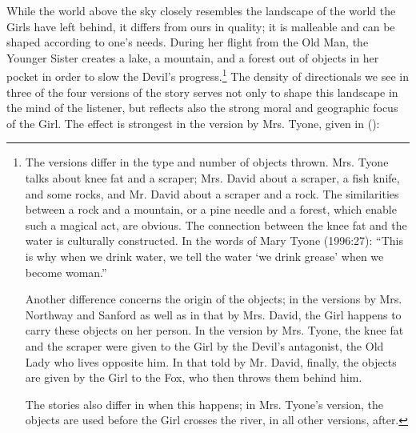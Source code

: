 While the world above the sky closely resembles the landscape of the world the Girls have left behind, it differs from ours in quality; it is malleable and can be shaped according to one's needs. During her flight from the Old Man, the Younger Sister creates a lake, a mountain, and a forest out of objects in her pocket in order to slow the Devil's progress.\footnote{The versions differ in the type and number of objects thrown. Mrs. Tyone talks about knee fat and a scraper; Mrs. David about a scraper, a fish knife, and some rocks, and Mr. David about a scraper and a rock. The similarities between a rock and a mountain, or a pine needle and a forest,  which enable such a magical act, are obvious. The connection between the knee fat and the water is culturally constructed. In the words of Mary Tyone (1996:27): ``This is why when we drink water, we tell the water `we drink grease' when we become woman.''

Another difference concerns the origin of the objects; in the versions by Mrs. Northway and Sanford as well as in that by Mrs. David, the Girl happens to carry these objects on her person. In the version by Mrs. Tyone, the knee fat and the scraper were given to the Girl by the Devil's antagonist, the Old Lady who lives opposite him. In that told by Mr. David, finally, the objects are given by the Girl to the Fox, who then throws them behind him.

The stories also differ in when this happens; in Mrs. Tyone's version, the objects are used before the Girl crosses the river, in all other versions, after.} The density of directionals we see in three of the four versions of the story serves not only to shape this landscape in the mind of the listener, but reflects also the strong moral and geographic focus of the Girl. The effect is strongest in the version by Mrs. Tyone, given in ():

